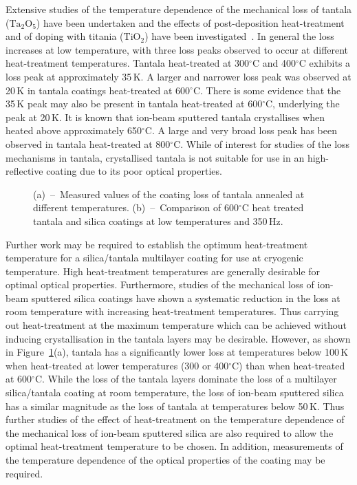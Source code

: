Extensive studies of the temperature dependence of the mechanical loss of tantala ($\mathrm{Ta_2O_5}$) have been undertaken and the effects of post-deposition heat-treatment and of doping with titania ($\mathrm{TiO_2}$) have been investigated~\cite{Martin2008,Martin2009,Martin2010}. In general the loss increases at low temperature, with three loss peaks observed to occur at different heat-treatment temperatures. Tantala heat-treated at 300$\mathrm{^\circ}$C and 400$\mathrm{^\circ}$C exhibits a loss peak at approximately 35\,K. A larger and narrower loss peak was observed at 20\,K in tantala coatings heat-treated at 600$\mathrm{^\circ}$C. There is some evidence that the 35\,K peak may also be present in tantala heat-treated at 600$\mathrm{^\circ}$C, underlying the peak at 20\,K. It is known that ion-beam sputtered tantala crystallises when heated above approximately 650$\mathrm{^\circ}$C. A large and very broad loss peak has been observed in tantala heat-treated at 800$\mathrm{^\circ}$C. 
While of interest for studies of the loss mechanisms in tantala, crystallised tantala is not suitable for use in an high-reflective coating due to its poor optical properties.

\begin{figure}[!h]
\begin{center}
\end{center}
\caption{(a)~--~Measured values of the coating loss of tantala annealed at different temperatures. (b)~--~Comparison of 600$\mathrm{^\circ}$C heat treated tantala and silica coatings at low temperatures and 350\,Hz.}
\label{fig:coating_loss_cryo}
\end{figure}

Further work may be required to establish the optimum heat-treatment temperature for a silica/tantala multilayer coating for use at cryogenic temperature. High heat-treatment temperatures are generally desirable for optimal optical properties. Furthermore, studies of the mechanical loss of ion-beam sputtered silica coatings have shown a systematic reduction in the loss at room temperature with increasing heat-treatment temperatures. Thus carrying out heat-treatment at the maximum temperature which can be achieved without inducing crystallisation in the tantala layers may be desirable. However, as shown in Figure~\ref{fig:coating_loss_cryo}(a), tantala has a significantly lower loss at temperatures below 100\,K when heat-treated at lower temperatures (300 or 400$\mathrm{^\circ}$C) than when heat-treated at 600$\mathrm{^\circ}$C. While the loss of the tantala layers dominate the loss of a multilayer silica/tantala coating at room temperature, the loss of ion-beam sputtered silica has a similar magnitude as the loss of tantala at temperatures below 50\,K. Thus further studies of the effect of heat-treatment on the temperature dependence of the mechanical loss of ion-beam sputtered silica are also required to allow the optimal heat-treatment temperature to be chosen. In addition, measurements of the temperature dependence of the optical properties of the coating may be required.

